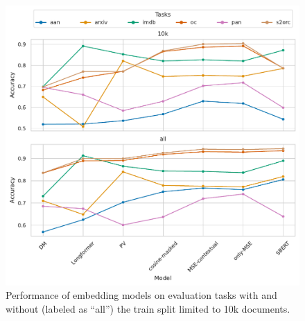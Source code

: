 










\begin{figure}

  \centering
  \includegraphics[width=\textwidth]{img/final_cls_evals.pdf}

  \caption{Performance of embedding models on evaluation tasks with and without
  (labeled as ``all'') the train split limited to 10k documents.}

  \label{fig:final_cls_evals}

\end{figure}


